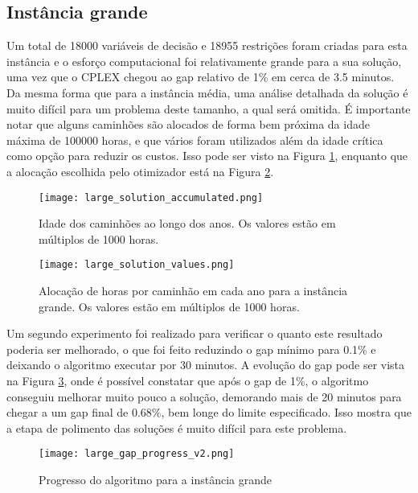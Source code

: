 \documentclass[conference]{IEEEtran}
\begin{document}
\subsection{Instância grande}

Um total de 18000 variáveis de decisão e 18955 restrições foram criadas para esta instância e o esforço computacional foi relativamente grande para a sua solução, uma vez que o CPLEX chegou ao gap relativo de 1\% em cerca de 3.5 minutos. Da mesma forma que para a instância média, uma análise detalhada da solução é muito difícil para um problema deste tamanho, a qual será omitida. É importante notar que alguns caminhões são alocados de forma bem próxima da idade máxima de 100000 horas, e que vários foram utilizados além da idade crítica como opção para reduzir os custos. Isso pode ser visto na Figura \ref{fig:large_solution_accumulated}, enquanto que a alocação escolhida pelo otimizador está na Figura \ref{fig:large_solution_values}.

\begin{figure}[h!]
	\centering
	\texttt{[image: large\_solution\_accumulated.png]}
	\caption{Idade dos caminhões ao longo dos anos. Os valores estão em múltiplos de 1000 horas.}
	\label{fig:large_solution_accumulated}
\end{figure}

\begin{figure}[h!]
	\centering
	\texttt{[image: large\_solution\_values.png]}
	\caption{Alocação de horas por caminhão em cada ano para a instância grande. Os valores estão em múltiplos de 1000 horas.}
	\label{fig:large_solution_values}
\end{figure}

Um segundo experimento foi realizado para verificar o quanto este resultado poderia ser melhorado, o que foi feito reduzindo o gap mínimo para 0.1\% e deixando o algoritmo executar por 30 minutos. A evolução do gap pode ser vista na Figura \ref{fig:large_gap_progress_v2}, onde é possível constatar que após o gap de 1\%, o algoritmo conseguiu melhorar muito pouco a solução, demorando mais de 20 minutos para chegar a um gap final de 0.68\%, bem longe do limite especificado. Isso mostra que a etapa de polimento das soluções é muito difícil para este problema.

\begin{figure}[h!]
	\centering
	\texttt{[image: large\_gap\_progress\_v2.png]}
	\caption{Progresso do algoritmo para a instância grande}
	\label{fig:large_gap_progress_v2}
\end{figure}
\end{document}
